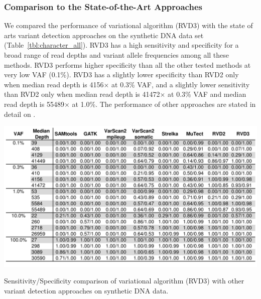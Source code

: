 \documentclass[11pt,reqno]{amsart}
\begin{document}


\subsubsection{Comparison to the State-of-the-Art Approaches}
We compared the performance of variational algorithm (RVD3) with the state of arts variant detection approaches on the synthetic DNA data set (Table~\ref{tbl:character_all}).
RVD3 has a high sensitivity and specificity for a broad range of read depths and variant allele frequencies among all these methods.
RVD3 performs higher specificity than all the other tested methods at very low VAF (0.1\%).
RVD3 has a slightly lower specificity than RVD2 only when median read depth is 4156$\times$ at 0.3\% VAF, and a slightly lower sensitivity than RVD2 only when median read depth is 41472$\times$ at 0.3\% VAF and median read depth is 55489$\times$ at 1.0\%.
The performance of other approaches are stated in detail on \citep{he2015rvd2}.

\begin{table}[htbp]
\centering
\includegraphics[width=1.0\textwidth]{tables/character_all.png}
\caption{Sensitivity/Specificity comparison of variational algorithm (RVD3) with other variant detection approaches on synthetic DNA data.}
\vspace{-5pt}
\label{tbl:character_all}
\end{table}
\end{document}
